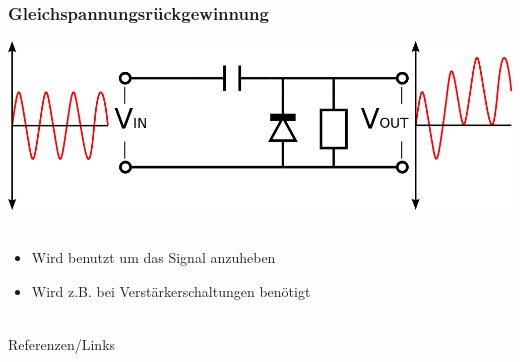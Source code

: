 \begin{frame}
    \frametitle{Gleichspannungsrückgewinnung}
    \begin{center}
        \includegraphics[width=1\textwidth,height=.6\textheight,keepaspectratio]{a05/Positive_Voltage_Clamping_Circuit.png}\\
        \tiny \hyperlink{refs}{\cite{wm}} \\[1em] \large
        \begin{itemize}
			\item Wird benutzt um das Signal anzuheben
			\item Wird z.B. bei Verstärkerschaltungen benötigt
    	\end{itemize}
 	\end{center}
\end{frame}

\renewcommand{\refname}{Referenzen}

\hypertarget{refs}{}
\textcolor{white}{} \\ %
\Large Referenzen/Links
\footnotesize

